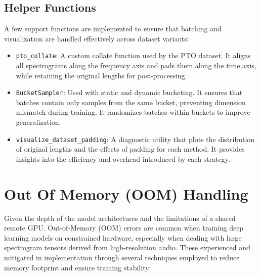 \subsection{Helper Functions}
\label{subsec:helper_functions}

A few support functions are implemented to ensure that batching and visualization are handled effectively across dataset variants:

\begin{itemize}
    \item \texttt{pto\_collate}: A custom collate function used by the PTO dataset. It aligns all spectrograms along the frequency axis and pads them along the time axis, while retaining the original lengths for post-processing.
    \item \texttt{BucketSampler}: Used with static and dynamic bucketing. It ensures that batches contain only samples from the same bucket, preventing dimension mismatch during training. It randomizes batches within buckets to improve generalization.
    \item \texttt{visualize\_dataset\_padding}: A diagnostic utility that plots the distribution of original lengths and the effects of padding for each method. It provides insights into the efficiency and overhead introduced by each strategy.
\end{itemize}

\section{Out Of Memory (OOM) Handling}
\label{sec:oom_handling}

Given the depth of the model architectures and the limitations of a shared remote GPU. Out-of-Memory (OOM) errors are common when training deep learning models on constrained hardware, especially when dealing with large spectrogram tensors derived from high-resolution audio. These experienced and mitigated in implementation through several techniques employed to reduce memory footprint and ensure training stability:

